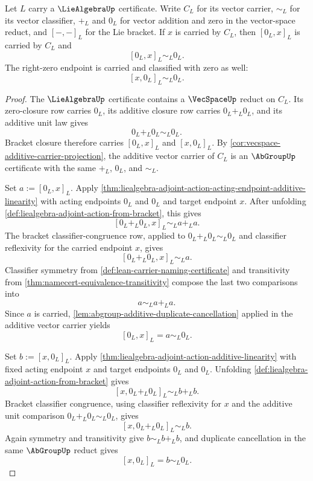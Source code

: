 \begin{theorem}
\label{thm:liealgebra-bracket-left-zero-annihilation}
Let $L$ carry a $\LieAlgebraUp$ certificate. Write $C_L$ for its vector carrier, $\sim_L$ for its vector classifier, $+_L$ and $0_L$ for vector addition and zero in the vector-space reduct, and $[-,-]_L$ for the Lie bracket. If $x$ is carried by $C_L$, then $[0_L,x]_L$ is carried by $C_L$ and
$$
[0_L,x]_L\sim_L0_L.
$$
The right-zero endpoint is carried and classified with zero as well:
$$
[x,0_L]_L\sim_L0_L.
$$
\end{theorem}
\begin{proof}
The $\LieAlgebraUp$ certificate contains a $\VecSpaceUp$ reduct on $C_L$. Its zero-closure row carries $0_L$, its additive closure row carries $0_L+_L0_L$, and its additive unit law gives
$$
0_L+_L0_L\sim_L0_L.
$$
Bracket closure therefore carries $[0_L,x]_L$ and $[x,0_L]_L$. By \autoref{cor:vecspace-additive-carrier-projection}, the additive vector carrier of $C_L$ is an $\AbGroupUp$ certificate with the same $+_L$, $0_L$, and $\sim_L$.

Set $a:=[0_L,x]_L$. Apply \autoref{thm:liealgebra-adjoint-action-acting-endpoint-additive-linearity} with acting endpoints $0_L$ and $0_L$ and target endpoint $x$. After unfolding \autoref{def:liealgebra-adjoint-action-from-bracket}, this gives
$$
[0_L+_L0_L,x]_L\sim_La+_La.
$$
The bracket classifier-congruence row, applied to $0_L+_L0_L\sim_L0_L$ and classifier reflexivity for the carried endpoint $x$, gives
$$
[0_L+_L0_L,x]_L\sim_La.
$$
Classifier symmetry from \autoref{def:lean-carrier-naming-certificate} and transitivity from \autoref{thm:namecert-equivalence-transitivity} compose the last two comparisons into
$$
a\sim_La+_La.
$$
Since $a$ is carried, \autoref{lem:abgroup-additive-duplicate-cancellation} applied in the additive vector carrier yields
$$
[0_L,x]_L=a\sim_L0_L.
$$

Set $b:=[x,0_L]_L$. Apply \autoref{thm:liealgebra-adjoint-action-additive-linearity} with fixed acting endpoint $x$ and target endpoints $0_L$ and $0_L$. Unfolding \autoref{def:liealgebra-adjoint-action-from-bracket} gives
$$
[x,0_L+_L0_L]_L\sim_Lb+_Lb.
$$
Bracket classifier congruence, using classifier reflexivity for $x$ and the additive unit comparison $0_L+_L0_L\sim_L0_L$, gives
$$
[x,0_L+_L0_L]_L\sim_Lb.
$$
Again symmetry and transitivity give $b\sim_Lb+_Lb$, and duplicate cancellation in the same $\AbGroupUp$ reduct gives
$$
[x,0_L]_L=b\sim_L0_L.
$$
\end{proof}

